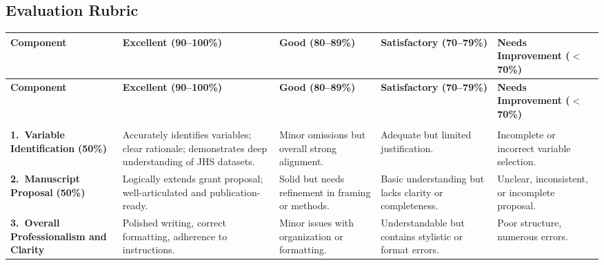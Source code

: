 \begin{landscape}

    \section{Evaluation Rubric}

    {\footnotesize

    \begin{longtable}{%
        >{\RaggedRight\arraybackslash}p{2.5cm}   %
        >{\RaggedRight\arraybackslash}p{4.5cm}   %
        >{\RaggedRight\arraybackslash}p{4.2cm}   %
        >{\RaggedRight\arraybackslash}p{4.2cm}   %
        >{\RaggedRight\arraybackslash}p{4.5cm}}  %

    \toprule
    \textbf{Component} &
    \textbf{Excellent (90--100\%)} &
    \textbf{Good (80--89\%)} &
    \textbf{Satisfactory (70--79\%)} &
    \textbf{Needs Improvement ($<$70\%)} \\
    \midrule
    \endfirsthead

    \toprule
    \textbf{Component} &
    \textbf{Excellent (90--100\%)} &
    \textbf{Good (80--89\%)} &
    \textbf{Satisfactory (70--79\%)} &
    \textbf{Needs Improvement ($<$70\%)} \\
    \midrule
    \endhead

    \midrule
    \multicolumn{5}{r}{\textit{Continued on next page}} \\
    \endfoot

    \bottomrule
    \endlastfoot

    \textbf{1.\ Variable Identification}
    \newline\textbf{(50\%)}
    &
    Accurately identifies variables; clear rationale; demonstrates deep
    understanding of JHS datasets.
    &
    Minor omissions but overall strong alignment.
    &
    Adequate but limited justification.
    &
    Incomplete or incorrect variable selection.
    \\
    \midrule

    \textbf{2.\ Manuscript Proposal}
    \newline\textbf{(50\%)}
    &
    Logically extends grant proposal; well-articulated and publication-ready.
    &
    Solid but needs refinement in framing or methods.
    &
    Basic understanding but lacks clarity or completeness.
    &
    Unclear, inconsistent, or incomplete proposal.
    \\
    \midrule

    \textbf{3.\ Overall Professionalism and Clarity}
    &
    Polished writing, correct formatting, adherence to instructions.
    &
    Minor issues with organization or formatting.
    &
    Understandable but contains stylistic or format errors.
    &
    Poor structure, numerous errors.
    \\

    \end{longtable}

    } %

\end{landscape}